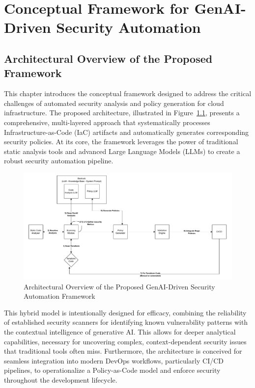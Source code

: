 \chapter{Conceptual Framework for GenAI-Driven Security Automation}


\section{Architectural Overview of the Proposed Framework}

This chapter introduces the conceptual framework designed to address the critical challenges of automated security analysis and policy generation for cloud infrastructure. The proposed architecture, illustrated in Figure~\ref{fig:prototype-architecture}, presents a comprehensive, multi-layered approach that systematically processes Infrastructure-as-Code (IaC) artifacts and automatically generates corresponding security policies. At its core, the framework leverages the power of traditional static analysis tools and advanced Large Language Models (LLMs) to create a robust security automation pipeline.
\begin{figure}[htbp]
\centering
\includegraphics[width=\textwidth]{Figures/prototype.pdf}
\caption{Architectural Overview of the Proposed GenAI-Driven Security Automation Framework}
\label{fig:prototype-architecture}
\end{figure}

This hybrid model is intentionally designed for efficacy, combining the reliability of established security scanners for identifying known vulnerability patterns with the contextual intelligence of generative AI. This allows for deeper analytical capabilities, necessary for uncovering complex, context-dependent security issues that traditional tools often miss. Furthermore, the architecture is conceived for seamless integration into modern DevOps workflows, particularly CI/CD pipelines, to operationalize a Policy-as-Code model and enforce security throughout the development lifecycle.

